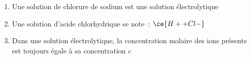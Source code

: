 \begin{enumerate}
    \item Une solution de chlorure de sodium est une solution électrolytique
          \dotfill\V\F
    
    \item Une solution d'acide chlorhydrique se note~: $\ce{H+ + Cl-}$
          \dotfill\V\F

    \item Dans une solution électrolytique, la concentration molaire des ions
          présents est toujours égale à sa concentration $c$
          \dotfill\V\F
\end{enumerate}


